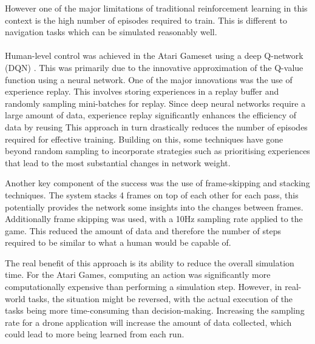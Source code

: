 However one of the major limitations of traditional reinforcement learning in this context is the high number of episodes required to train.
This is different to navigation tasks which can be simulated reasonably well. \\\\

Human-level control was achieved in the Atari Gameset using a deep Q-network (DQN) \cite{humanLevelControlDQN}.
This was primarily due to the innovative approximation of the Q-value function using a neural network.
One of the major innovations was the use of experience replay.
This involves storing experiences in a replay buffer and randomly sampling mini-batches for replay.
Since deep neural networks require a large amount of data, experience replay significantly enhances the efficiency of data by reusing
This approach in turn drastically reduces the number of episodes required for effective training.
Building on this, some techniques have gone beyond random sampling to incorporate strategies such as prioritising experiences that lead to the most substantial changes in network weight.

Another key component of the success was the use of frame-skipping and stacking techniques.
The system stacks 4 frames on top of each other for each pass, this potentially provides the network some insights into the changes between frames.
Additionally frame skipping was used, with a 10Hz sampling rate applied to the game.
This reduced the amount of data and therefore the number of steps required to be similar to what a human would be capable of.

The real benefit of this approach is its ability to reduce the overall simulation time.
For the Atari Games, computing an action was significantly more computationally expensive than performing a simulation step.
However, in real-world tasks, the situation might be reversed, with the actual execution of the tasks being more time-consuming than decision-making.
Increasing the sampling rate for a drone application will increase the amount of data collected, which could lead to more being learned from each run. \\\\


